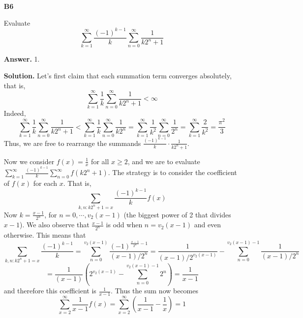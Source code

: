 \documentclass[11pt,a4paper]{article}
\newcommand{\<}{\langle}
\renewcommand{\>}{\rangle}
\begin{document}
\begin{enumerate}
	\item [\textbf{B6}]
	
	Evaluate 
	\[
	\sum_{k=1}^{\infty} \frac{(-1)^{k-1}}{k} \sum_{n=0}^{\infty} \frac{1}{k2^n+1}
	\]
	
	\textbf{Answer.} 1. 
	
	\textbf{Solution.} 
	Let's first claim that each summation term converges absolutely, that is, 
	\[
	\sum_{k=1}^{\infty} \frac{1}{k} \sum_{n=0}^{\infty} \frac{1}{k2^n+1} < \infty
	\]
	Indeed, 
	\[
	\sum_{k=1}^{\infty} \frac{1}{k} \sum_{n=0}^{\infty} \frac{1}{k2^n+1}
	< \sum_{k=1}^{\infty} \frac{1}{k} \sum_{n=0}^{\infty} \frac{1}{k2^n}
	=\sum_{k=1}^{\infty} \frac{1}{k^2}\sum_{n=0}^{\infty} \frac{1}{2^n}
	=\sum_{k=1}^{\infty} \frac{2}{k^2}
	=\frac{\pi^2}{3}
	\]
	Thus, we are free to rearrange the summands $\frac{(-1)^{k-1}}{k}\cdot \frac{1}{k2^n+1}$. 
	
	Now we consider $f(x)=\frac{1}{x}$ for all $x\ge 2$, 
	and we are to evaluate $\sum_{k=1}^{\infty} \frac{(-1)^{k-1}}{k} \sum_{n=0}^{\infty} f(k2^n+1)$. 
	The strategy is to consider the coefficient of $f(x)$ for each $x$. 
	That is, 
	\[
	\sum_{k, n: k2^n+1=x} \frac{(-1)^{k-1}}{k} f(x)
	\]
	Now $k=\frac{x-1}{2^n}$, for $n=0, \cdots, v_2(x-1)$ (the biggest power of 2 that divides $x-1$). 
	We also observe that $\frac{x-1}{2^n}$ is odd when $n=v_2(x-1)$ and even otherwise. 
	This means that 
	\[
	\sum_{k, n: k2^n+1=x} \frac{(-1)^{k-1}}{k}
	=\sum_{n=0}^{v_2(x-1)}\frac{(-1)^{\frac{x-1}{2^n}-1}}{(x-1)/2^n}
	=\frac{1}{(x-1)/2^{v_2(x-1)}}
	-\sum_{n=0}^{v_2(x-1)-1}\frac{1}{(x-1)/2^n}
	\]\[
	=\frac{1}{(x-1)}\left(2^{v_2(x-1)}-\sum_{n=0}^{v_2(x-1)-1}2^n\right)
	=\frac{1}{x-1}
	\]
	and therefore this coefficient is $\frac{1}{x-1}$. 
	Thus the sum now becomes 
	\[\sum_{x=2}^{\infty}\frac{1}{x-1}f(x)
	=\sum_{x=2}^{\infty}(\frac{1}{x-1}-\frac{1}{x})
	=1
	\]
	
\end{enumerate}
\end{document}
